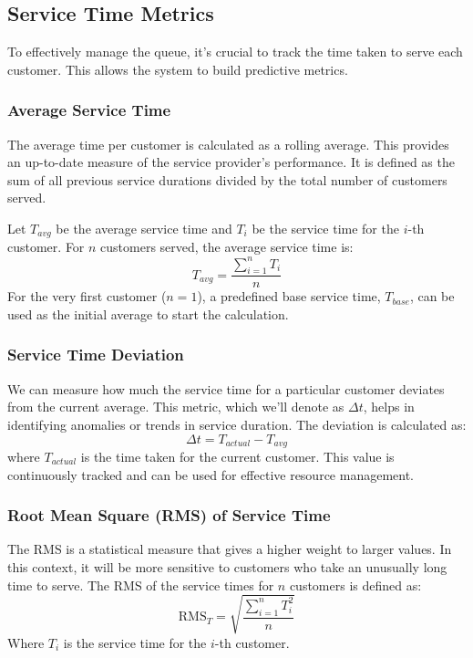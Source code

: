 \documentclass[12pt,a4paper]{report}
\begin{document}
\subsection{Service Time Metrics}
To effectively manage the queue, it's crucial to track the time taken to serve each customer. This allows the system to build predictive metrics.

\subsubsection{Average Service Time}
The average time per customer is calculated as a rolling average. This provides an up-to-date measure of the service provider's performance. It is defined as the sum of all previous service durations divided by the total number of customers served.

Let $T_{avg}$ be the average service time and $T_i$ be the service time for the $i$-th customer. For $n$ customers served, the average service time is:
\begin{equation}
    T_{avg} = \frac{\sum_{i=1}^{n} T_i}{n}
\end{equation}
For the very first customer ($n=1$), a predefined base service time, $T_{base}$, can be used as the initial average to start the calculation.

\subsubsection{Service Time Deviation}
We can measure how much the service time for a particular customer deviates from the current average. This metric, which we'll denote as $\Delta t$, helps in identifying anomalies or trends in service duration. The deviation is calculated as:
\begin{equation}
    \Delta t = T_{actual} - T_{avg}
\end{equation}
where $T_{actual}$ is the time taken for the current customer. This value is continuously tracked and can be used for effective resource management.

\subsubsection{Root Mean Square (RMS) of Service Time}
The RMS is a statistical measure that gives a higher weight to larger values. In this context, it will be more sensitive to customers who take an unusually long time to serve. The RMS of the service times for $n$ customers is defined as:
\begin{equation}
    \text{RMS}_T = \sqrt{\frac{\sum_{i=1}^{n} T_i^2}{n}}
\end{equation}
Where $T_i$ is the service time for the $i$-th customer.
\end{document}
